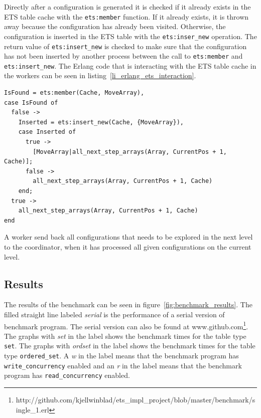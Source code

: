 \documentclass[aps,pre,preprint,nofootinbib]{revtex4}
\begin{document}
    Directly after a configuration is generated it is checked if it already exists in the ETS table cache with the \verb|ets:member| function.
    If it already exists, it is thrown away because the configuration has already been visited.
    Otherwise, the configuration is inserted in the ETS table with the \verb|ets:inser_new| operation.
    The return value of \verb|ets:insert_new| is checked to make sure that the configuration has not been inserted by another process between the call to \verb|ets:member| and \verb|ets:insert_new|.
    The Erlang code that is interacting with the ETS table cache in the workers can be seen in listing~\ref{li_erlang_ets_interaction}.

    \lstset{language=erlang, caption=Worker code that is interacting with ETS, label=li_erlang_ets_interaction} 
\begin{lstlisting}[float=htb] 
IsFound = ets:member(Cache, MoveArray),
case IsFound of
  false ->
    Inserted = ets:insert_new(Cache, {MoveArray}),
    case Inserted of
      true ->
        [MoveArray|all_next_step_arrays(Array, CurrentPos + 1, Cache)];
      false ->
        all_next_step_arrays(Array, CurrentPos + 1, Cache)
    end;
  true ->
    all_next_step_arrays(Array, CurrentPos + 1, Cache)
end
\end{lstlisting}
    
    A worker send back all configurations that needs to be explored in the next level to the coordinator, when it has processed all given configurations on the current level.


\subsection{Results}

  The results of the benchmark can be seen in figure~\ref{fig:benchmark_results}.
  The filled straight line labeled \emph{serial} is the performance of a serial version of benchmark program.
  The serial version can also be found at www.github.com\footnote{http://github.com/kjellwinblad/ets\_impl\_project/blob/master/benchmark/single\_1.erl}.
  The graphs with \emph{set} in the label shows the benchmark times for the table type \verb|set|.
  The graphs with \emph{ordset} in the label shows the benchmark times for the table type \verb|ordered_set|.
  A \emph{w} in the label means that the benchmark program has \verb|write_concurrency| enabled and an \emph{r} in the label means that the benchmark program has \verb|read_concurrency| enabled.
  
\end{document}
